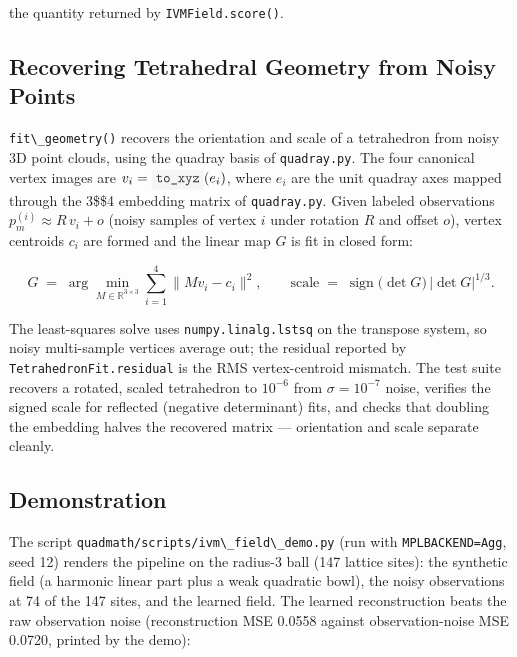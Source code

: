 \documentclass[
  10pt,
]{article}
\newcommand{\passthrough}[1]{#1}
\renewcommand{\texttt}[1]{%
    \colorbox{codebg}{\color{codefg}\ttfamily #1}%
}
\begin{document}
the quantity returned by \passthrough{\lstinline!IVMField.score()!}.

\subsection{Recovering Tetrahedral Geometry from Noisy
Points}\label{recovering-tetrahedral-geometry-from-noisy-points}

\passthrough{\lstinline!fit\_geometry()!} recovers the orientation and
scale of a tetrahedron from noisy 3D point clouds, using the quadray
basis of \passthrough{\lstinline!quadray.py!}. The four canonical vertex
images are \(v_i = \texttt{to\_xyz}(e_i)\), where \(e_i\) are the unit
quadray axes mapped through the 3\$\times\$4 embedding matrix of
\passthrough{\lstinline!quadray.py!}. Given labeled observations
\(p^{(i)}_m \approx R\, v_i + o\) (noisy samples of vertex \(i\) under
rotation \(R\) and offset \(o\)), vertex centroids \(c_i\) are formed
and the linear map \(G\) is fit in closed form:

\begin{equation}
\label{eq:ivm-fit}
G \;=\; \arg\min_{M \in \mathbb{R}^{3\times 3}} \sum_{i=1}^{4}
\bigl\| M v_i - c_i \bigr\|^2 ,
\qquad
\text{scale} \;=\; \operatorname{sign}\bigl(\det G\bigr)\, \bigl|\det G\bigr|^{1/3}.
\end{equation}

The least-squares solve uses
\passthrough{\lstinline!numpy.linalg.lstsq!} on the transpose system, so
noisy multi-sample vertices average out; the residual reported by
\passthrough{\lstinline!TetrahedronFit.residual!} is the RMS
vertex-centroid mismatch. The test suite recovers a rotated, scaled
tetrahedron to \(10^{-6}\) from \(\sigma =
10^{-7}\) noise, verifies the signed scale for reflected (negative
determinant) fits, and checks that doubling the embedding halves the
recovered matrix --- orientation and scale separate cleanly.

\subsection{Demonstration}\label{demonstration}

The script
\passthrough{\lstinline!quadmath/scripts/ivm\_field\_demo.py!} (run with
\passthrough{\lstinline!MPLBACKEND=Agg!}, seed 12) renders the pipeline
on the radius-3 ball (147 lattice sites): the synthetic field (a
harmonic linear part plus a weak quadratic bowl), the noisy observations
at 74 of the 147 sites, and the learned field. The learned
reconstruction beats the raw observation noise (reconstruction MSE
0.0558 against observation-noise MSE 0.0720, printed by the demo):
\end{document}
